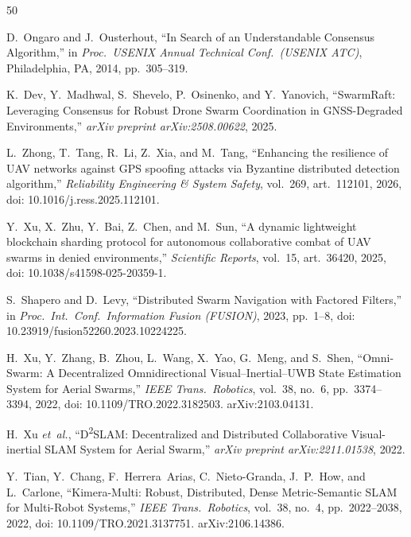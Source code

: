 \documentclass[conference,10pt]{IEEEtran}
\begin{document}
\begin{thebibliography}{50}
\scriptsize
\setlength{\itemsep}{-1pt}
\setlength{\parsep}{0pt}

D.~Ongaro and J.~Ousterhout,
``In Search of an Understandable Consensus Algorithm,''
in \emph{Proc.\ USENIX Annual Technical Conf.\ (USENIX ATC)}, Philadelphia, PA, 2014, pp.~305--319.

K.~Dev, Y.~Madhwal, S.~Shevelo, P.~Osinenko, and Y.~Yanovich,
``SwarmRaft: Leveraging Consensus for Robust Drone Swarm Coordination in GNSS-Degraded Environments,''
\emph{arXiv preprint arXiv:2508.00622}, 2025.

L.~Zhong, T.~Tang, R.~Li, Z.~Xia, and M.~Tang,
``Enhancing the resilience of UAV networks against GPS spoofing attacks via Byzantine distributed detection algorithm,''
\emph{Reliability Engineering \& System Safety}, vol.~269, art.~112101, 2026,
doi: 10.1016/j.ress.2025.112101.

Y.~Xu, X.~Zhu, Y.~Bai, Z.~Chen, and M.~Sun,
``A dynamic lightweight blockchain sharding protocol for autonomous collaborative combat of UAV swarms in denied environments,''
\emph{Scientific Reports}, vol.~15, art.~36420, 2025,
doi: 10.1038/s41598-025-20359-1.

S.~Shapero and D.~Levy,
``Distributed Swarm Navigation with Factored Filters,''
in \emph{Proc.\ Int.\ Conf.\ Information Fusion (FUSION)}, 2023, pp.~1--8,
doi: 10.23919/fusion52260.2023.10224225.

H.~Xu, Y.~Zhang, B.~Zhou, L.~Wang, X.~Yao, G.~Meng, and S.~Shen,
``Omni-Swarm: A Decentralized Omnidirectional Visual--Inertial--UWB State Estimation System for Aerial Swarms,''
\emph{IEEE Trans.\ Robotics}, vol.~38, no.~6, pp.~3374--3394, 2022,
doi: 10.1109/TRO.2022.3182503. arXiv:2103.04131.

H.~Xu \emph{et~al.},
``D\textsuperscript{2}SLAM: Decentralized and Distributed Collaborative Visual-inertial {SLAM} System for Aerial Swarm,''
\emph{arXiv preprint arXiv:2211.01538}, 2022.

Y.~Tian, Y.~Chang, F.~Herrera~Arias, C.~Nieto-Granda, J.~P.~How, and L.~Carlone,
``Kimera-Multi: Robust, Distributed, Dense Metric-Semantic SLAM for Multi-Robot Systems,''
\emph{IEEE Trans.\ Robotics}, vol.~38, no.~4, pp.~2022--2038, 2022,
doi: 10.1109/TRO.2021.3137751. arXiv:2106.14386.


\end{thebibliography}
\end{document}
